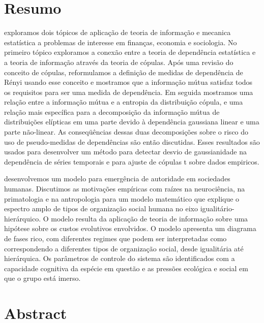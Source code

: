 \chapter*{Resumo}
 exploramos dois tópicos de aplicação de teoria de informação e mecanica estatística a problemas de interesse em finanças, economia e sociologia. No primeiro tópico exploramos a conexão entre a teoria de dependência estatística e a teoria de informação através da teoria de cópulas. Após uma revisão do conceito de cópulas, reformulamos a definição de medidas de dependência de Rényi\citep{Renyi1959} usando esse conceito e mostramos que a informação mútua satisfaz todos os requisitos para ser uma medida de dependência. Em seguida mostramos uma relação entre a informação mútua e a entropia da distribuição cópula, e uma relação mais específica para a decomposição da informação mútua de distribuições elípticas em uma parte devido à dependência gaussiana linear e uma parte não-linear. As conseqüências dessas duas decomposições sobre o risco do uso de pseudo-medidas de dependências são então discutidas. Esses resultados são usados para desenvolver um método para detectar desvio de gaussianidade na dependência de séries temporais e para ajuste de cópulas t sobre dados empiricos\citep{Calsaverini2009}.

 desenvolvemos um modelo para emergência de autoridade em sociedades humanas. Discutimos as motivações empíricas com raízes na neurociência, na primatologia e na antropologia para um modelo matemático que explique o espectro amplo de tipos de organização social humana no eixo igualitário-hierárquico. O modelo resulta da aplicação de teoria de informação sobre uma hipótese sobre os custos evolutivos envolvidos. O modelo apresenta um diagrama de fases rico, com diferentes regimes que podem ser interpretadas como correspondendo a diferentes tipos de organização social, desde igualitária até hierárquica. Os parâmetros de controle do sistema são identificados com a capacidade cognitiva da espécie em questão e as pressões ecológica e social em que o grupo está imerso.

\chapter*{Abstract}
 
